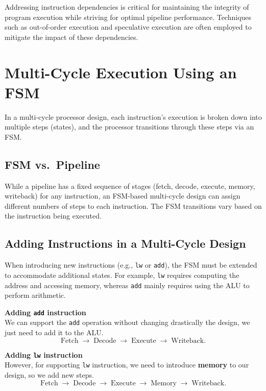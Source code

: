 Addressing instruction dependencies is critical for maintaining the integrity of program execution while striving for optimal pipeline performance. Techniques such as out-of-order execution and speculative execution are often employed to mitigate the impact of these dependencies.
\section{Multi-Cycle Execution Using an FSM}
In a multi-cycle processor design, each instruction's execution is broken down into multiple steps (states), and the processor transitions through these steps via an FSM.

\subsection{FSM vs.\ Pipeline}
While a pipeline has a fixed sequence of stages (fetch, decode, execute, memory, writeback) for any instruction, an FSM-based multi-cycle design can assign different numbers of steps to each instruction. The FSM transitions vary based on the instruction being executed.



\subsection{Adding Instructions in a Multi-Cycle Design}
When introducing new instructions (e.g., \texttt{lw} or \texttt{add}), the FSM must be extended to accommodate additional states. For example, \texttt{lw} requires computing the address and accessing memory, whereas \texttt{add} mainly requires using the ALU to perform arithmetic. \\
\begin{minipage}[t]{0.45\textwidth}
\textbf{Adding \texttt{add} instruction}\\
We can support the \texttt{add} operation without changing drastically the design, we just need to add it to the ALU.
\[
\text{Fetch} \; \rightarrow \; \text{Decode} \; \rightarrow \; \text{Execute} \; \rightarrow \; \text{Writeback}.
\]
\end{minipage}
\hfill
\vline
\hfill
\begin{minipage}[t]{0.45\textwidth}
\textbf{Adding \texttt{lw} instruction}\\
However, for supporting \texttt{lw} instruction, we need to introduce \textbf{memory} to our design, so we add new steps.
\[
\text{Fetch} \; \rightarrow \; \text{Decode} \; \rightarrow \; \text{Execute} \; \rightarrow \; \text{Memory} \; \rightarrow \; \text{Writeback}.
\]
\end{minipage}
\newpage

